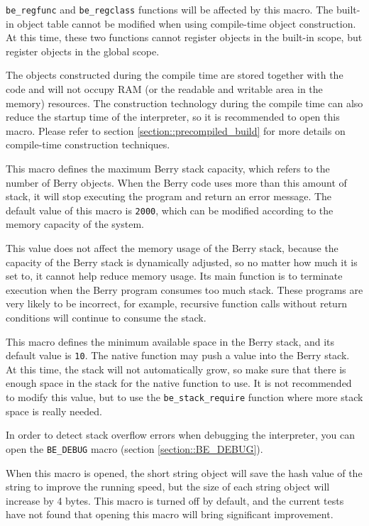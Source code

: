 \texttt{be\_regfunc} and \texttt{be\_regclass} functions will be affected by this macro. The built-in object table cannot be modified when using compile-time object construction. At this time, these two functions cannot register objects in the built-in scope, but register objects in the global scope.

The objects constructed during the compile time are stored together with the code and will not occupy RAM (or the readable and writable area in the memory) resources. The construction technology during the compile time can also reduce the startup time of the interpreter, so it is recommended to open this macro. Please refer to section \ref{section::precompiled_build} for more details on compile-time construction techniques.


This macro defines the maximum Berry stack capacity, which refers to the number of Berry objects. When the Berry code uses more than this amount of stack, it will stop executing the program and return an error message. The default value of this macro is \texttt{2000}, which can be modified according to the memory capacity of the system.

This value does not affect the memory usage of the Berry stack, because the capacity of the Berry stack is dynamically adjusted, so no matter how much it is set to, it cannot help reduce memory usage. Its main function is to terminate execution when the Berry program consumes too much stack. These programs are very likely to be incorrect, for example, recursive function calls without return conditions will continue to consume the stack.


This macro defines the minimum available space in the Berry stack, and its default value is \texttt{10}. The native function may push a value into the Berry stack. At this time, the stack will not automatically grow, so make sure that there is enough space in the stack for the native function to use. It is not recommended to modify this value, but to use the \texttt{be\_stack\_require} function where more stack space is really needed.

In order to detect stack overflow errors when debugging the interpreter, you can open the \texttt{BE\_DEBUG} macro (section \ref{section::BE_DEBUG}).

When this macro is opened, the short string object will save the hash value of the string to improve the running speed, but the size of each string object will increase by 4 bytes. This macro is turned off by default, and the current tests have not found that opening this macro will bring significant improvement.


